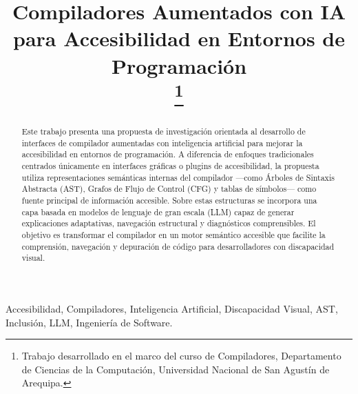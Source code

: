 \documentclass[conference]{IEEEtran}
\begin{document}
\title{Compiladores Aumentados con IA para Accesibilidad en Entornos de Programación\\
\thanks{Trabajo desarrollado en el marco del curso de Compiladores, Departamento de Ciencias de la Computación, Universidad Nacional de San Agustín de Arequipa.}
}

\author{


\and
{}

}

\maketitle

\begin{abstract}

Este trabajo presenta una propuesta de investigación orientada al desarrollo de interfaces de compilador aumentadas con inteligencia artificial para mejorar la accesibilidad en entornos de programación. A diferencia de enfoques tradicionales centrados únicamente en interfaces gráficas o plugins de accesibilidad, la propuesta utiliza representaciones semánticas internas del compilador —como Árboles de Sintaxis Abstracta (AST), Grafos de Flujo de Control (CFG) y tablas de símbolos— como fuente principal de información accesible. Sobre estas estructuras se incorpora una capa basada en modelos de lenguaje de gran escala (LLM) capaz de generar explicaciones adaptativas, navegación estructural y diagnósticos comprensibles. El objetivo es transformar el compilador en un motor semántico accesible que facilite la comprensión, navegación y depuración de código para desarrolladores con discapacidad visual.

\end{abstract}


\begin{IEEEkeywords}
Accesibilidad, Compiladores, Inteligencia Artificial, Discapacidad Visual, AST, Inclusión, LLM, Ingeniería de Software.
\end{IEEEkeywords}
\end{document}
